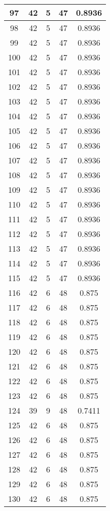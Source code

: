 \documentclass[letterpaper, 12pt]{article}
\begin{document}
\begin{longtable}{|c|c|c|c|c|}
\hline
97 & 42 & 5 & 47 & 0.8936 \\
\hline
98 & 42 & 5 & 47 & 0.8936 \\
\hline
99 & 42 & 5 & 47 & 0.8936 \\
\hline
100 & 42 & 5 & 47 & 0.8936 \\
\hline
101 & 42 & 5 & 47 & 0.8936 \\
\hline
102 & 42 & 5 & 47 & 0.8936 \\
\hline
103 & 42 & 5 & 47 & 0.8936 \\
\hline
104 & 42 & 5 & 47 & 0.8936 \\
\hline
105 & 42 & 5 & 47 & 0.8936 \\
\hline
106 & 42 & 5 & 47 & 0.8936 \\
\hline
107 & 42 & 5 & 47 & 0.8936 \\
\hline
108 & 42 & 5 & 47 & 0.8936 \\
\hline
109 & 42 & 5 & 47 & 0.8936 \\
\hline
110 & 42 & 5 & 47 & 0.8936 \\
\hline
111 & 42 & 5 & 47 & 0.8936 \\
\hline
112 & 42 & 5 & 47 & 0.8936 \\
\hline
113 & 42 & 5 & 47 & 0.8936 \\
\hline
114 & 42 & 5 & 47 & 0.8936 \\
\hline
115 & 42 & 5 & 47 & 0.8936 \\
\hline
116 & 42 & 6 & 48 & 0.875 \\
\hline
117 & 42 & 6 & 48 & 0.875 \\
\hline
118 & 42 & 6 & 48 & 0.875 \\
\hline
119 & 42 & 6 & 48 & 0.875 \\
\hline
120 & 42 & 6 & 48 & 0.875 \\
\hline
121 & 42 & 6 & 48 & 0.875 \\
\hline
122 & 42 & 6 & 48 & 0.875 \\
\hline
123 & 42 & 6 & 48 & 0.875 \\
\hline
124 & 39 & 9 & 48 & 0.7411 \\
\hline
125 & 42 & 6 & 48 & 0.875 \\
\hline
126 & 42 & 6 & 48 & 0.875 \\
\hline
127 & 42 & 6 & 48 & 0.875 \\
\hline
128 & 42 & 6 & 48 & 0.875 \\
\hline
129 & 42 & 6 & 48 & 0.875 \\
\hline
130 & 42 & 6 & 48 & 0.875 \\

\end{longtable}
\end{document}
